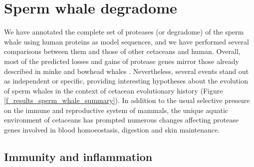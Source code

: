 \section{Sperm whale degradome} \label{s_sperm_whale_results}

We have annotated the complete set of proteases (or degradome) of the sperm whale using human proteins as model sequences, and we have performed several comparisons between them and those of other cetaceans and human.
Overall, most of the predicted losses and gains of protease genes mirror those already described in minke \cite{Yim2014c} and bowhead whales \cite{Keane2015}.
Nevertheless, several events stand out as independent or specific, providing interesting hypotheses about the evolution of sperm whales in the context of cetacean evolutionary history (Figure \ref{f_results_sperm_whale_summary}).
In addition to the usual selective pressure on the immune and reproductive system of mammals, the unique aquatic environment of cetaceans has prompted numerous changes affecting protease genes involved in blood homoeostasis, digestion and skin maintenance.

\subsection{Immunity and inflammation} \label{ss_sperm_whale_results_immuno}

